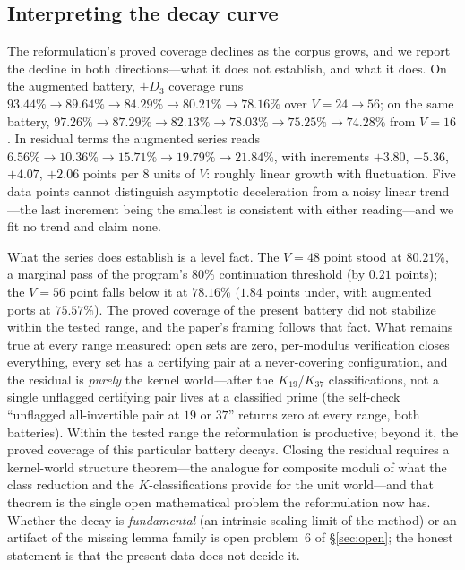\subsection{Interpreting the decay curve}

The reformulation's proved coverage declines as the corpus grows, and we
report the decline in both directions---what it does not
establish, and what it does. On the augmented battery, $+D_3$ coverage
runs $93.44\%\to89.64\%\to84.29\%\to80.21\%\to78.16\%$ over
$V=24\to56$; on the same battery,
$97.26\%\to87.29\%\to82.13\%\to78.03\%\to75.25\%\to74.28\%$ from
$V=16$. In residual terms the augmented series reads
$6.56\%\to10.36\%\to15.71\%\to19.79\%\to21.84\%$, with increments
$+3.80$, $+5.36$, $+4.07$, $+2.06$ points per $8$ units of $V$: roughly
linear growth with fluctuation. Five data points cannot distinguish
asymptotic deceleration from a noisy linear trend---the last increment
being the smallest is consistent with either reading---and we fit no
trend and claim none.

What the series does establish is a level fact. The $V=48$ point stood
at $80.21\%$, a marginal pass of the program's $80\%$ continuation
threshold (by $0.21$ points); the $V=56$ point falls below it at
$78.16\%$ ($1.84$ points under, with augmented ports at $75.57\%$). The
proved coverage of the present battery did not stabilize within the
tested range, and the paper's framing follows that fact. What remains
true at every range measured: open sets are zero, per-modulus
verification closes everything, every set has a certifying pair at a
never-covering configuration, and the residual is \emph{purely} the
kernel world---after the $K_{19}$/$K_{37}$ classifications, not a single
unflagged certifying pair lives at a classified prime (the self-check
``unflagged all-invertible pair at $19$ or $37$'' returns zero at every
range, both batteries). Within the tested range the reformulation is
productive; beyond it, the proved coverage of this particular battery
decays. Closing the residual requires a kernel-world structure
theorem---the analogue for composite moduli of what the class reduction
and the $K$-classifications provide for the unit world---and that theorem
is the single open mathematical problem the reformulation now has.
Whether the decay is \emph{fundamental} (an intrinsic scaling limit of
the method) or an artifact of the missing lemma family is open
problem~6 of \S\ref{sec:open}; the honest statement is that the present
data does not decide it.

